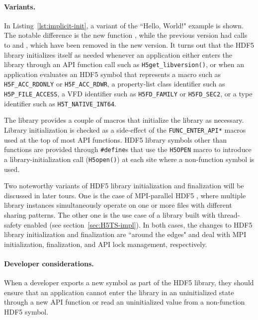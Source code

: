 \paragraph{Variants.} In Listing~\ref{lst:implicit-init}, a variant of the ``Hello, World!" example is shown. The notable difference is the new function , while the previous version had calls to  and , which have been removed in the new version. It turns out that the HDF5 library initializes itself as needed whenever an application either enters the library through an API function call such as \texttt{H5get\_libversion()}, or when an application evaluates an HDF5 symbol that represents a macro such as \texttt{H5F\_ACC\_RDONLY} or \texttt{H5F\_ACC\_RDWR}, a property-list class identifier such as \texttt{H5P\_FILE\_ACCESS}, a VFD identifier such as \texttt{H5FD\_FAMILY} or \texttt{H5FD\_SEC2}, or a type identifier
such as \texttt{H5T\_NATIVE\_INT64}.

The library provides a couple of macros that initialize the library as necessary. Library initialization is checked as a side-effect of the \texttt{FUNC\_ENTER\_API*} macros used at the top of most API functions. HDF5 library symbols other than functions are provided through \texttt{\#define}s that use the \texttt{H5OPEN} macro to introduce a library-initialization call (\texttt{H5open()}) at each site where a non-function symbol is used.

Two noteworthy variants of HDF5 library initialization and finalization will be discussed in later tours. One is the case of MPI-parallel HDF5
, where multiple library instances simultaneously operate on one or more files with different sharing patterns. The other one is the use case of a library built with thread-safety enabled  (see section~\ref{sec:H5TS-impl}). In both cases, the changes to HDF5 library initialization and finalization are ``around the edges" and deal with MPI initialization, finalization, and API lock management, respectively.



\paragraph{Developer considerations.} When a developer exports a new symbol as part of the HDF5 library, they should ensure that an application cannot enter the library in an uninitialized state through a new API function or read an uninitialized value from a non-function HDF5 symbol.

